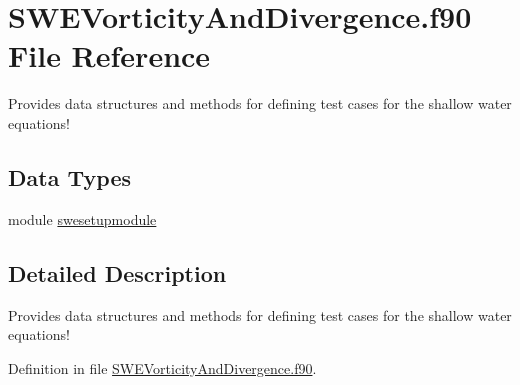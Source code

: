 \hypertarget{SWEVorticityAndDivergence_8f90}{\section{S\+W\+E\+Vorticity\+And\+Divergence.\+f90 File Reference}
\label{SWEVorticityAndDivergence_8f90}
}


Provides data structures and methods for defining test cases for the shallow water equations!  


\subsection*{Data Types}
\begin{DoxyCompactItemize}
\item 
module \hyperlink{classswesetupmodule}{swesetupmodule}
\end{DoxyCompactItemize}


\subsection{Detailed Description}
Provides data structures and methods for defining test cases for the shallow water equations! 



Definition in file \hyperlink{SWEVorticityAndDivergence_8f90_source}{S\+W\+E\+Vorticity\+And\+Divergence.\+f90}.

